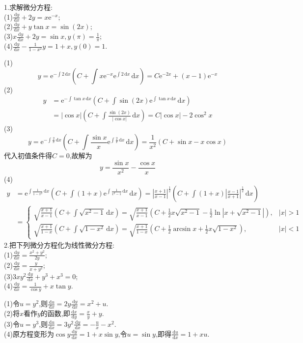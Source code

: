 \documentclass[titlepage,11pt,a4paper,twoside]{report}
\makeatletter
\newcommand\diff{\,\mathrm{d}}
\newcommand\e{\mathrm{e}}
\newenvironment{solve}{\par
	\pushQED{\qed}%
	\normalfont \topsep1\p@\@plus6\p@\relax
	\trivlist
	\item\relax
	{\hspace*{\parindent}{\heiti 解}\@addpunct{:}}\hspace\labelsep\ignorespaces
}{%
	\popQED\endtrivlist\@endpefalse
}
\makeatother
\begin{document}
1.求解微分方程:\\
(1)$\displaystyle\frac{\diff y}{\diff x}+2y=x\e^{-x}$;\\
(2)$\displaystyle\frac{\diff y}{\diff x}+y\tan x=\sin(2x)$;\\
(3)$\displaystyle x\frac{\diff y}{\diff x}+2y=\sin x,y(\pi)=\frac{1}{\pi}$;\\
(4)$\displaystyle\frac{\diff y}{\diff x}-\frac{1}{1-x^2}y=1+x,y(0)=1$.
\begin{solve}(1)\[y=\e^{-\int2\diff x}\left(C+\int x\e^{-x}\e^{\int2\diff x}\diff x\right)=C\e^{-2x}+(x-1)\e^{-x}\]
(2)\[\begin{split}
y&=\e^{-\int\tan x\diff x}\left(C+\int\sin(2x)\e^{\int\tan x\diff x}\diff x\right)\\
&=|\cos x|\left(C+\int\frac{\sin(2x)}{|\cos x|}\diff x\right)=C|\cos x|-2\cos^2x
\end{split}\]
(3)\[y=\e^{-\int\frac{2}{x}\diff x}\left(C+\int\frac{\sin x}{x}\e^{\int\frac{2}{x}\diff x}\diff x\right)=\frac{1}{x^2}(C+\sin x-x\cos x)\]
代入初值条件得$C=0$,故解为
\[y=\frac{\sin x}{x^2}-\frac{\cos x}{x}\]
(4)\[
\begin{split}
y&=\e^{\int\frac{1}{1-x^2}\diff x}\left(C+\int(1+x)\e^{\int\frac{1}{x^2-1}\diff x}\diff x\right)=\left|\frac{x+1}{x-1}\right|^{\frac{1}{2}}\left(C+\int(1+x)\left|\frac{x-1}{x+1}\right|^{\frac{1}{2}}\diff x\right)\\
&=\begin{cases}
\sqrt{\frac{x+1}{x-1}}\left(C+\int\sqrt{x^2-1}\diff x\right)=\sqrt{\frac{x+1}{x-1}}\left(C+\frac{1}{2}x\sqrt{x^2-1}-\frac{1}{2}\ln|x+\sqrt{x^2-1}|\right),&|x|>1\\
\sqrt{\frac{x+1}{1-x}}\left(C+\int\sqrt{1-x^2}\diff x\right)=\sqrt{\frac{x+1}{1-x}}\left(C+\frac{1}{2}\arcsin x+\frac{1}{2}x\sqrt{1-x^2}\right),&|x|<1
\end{cases}
\end{split}\]
\end{solve}
2.把下列微分方程化为线性微分方程:\\
(1)$\displaystyle\frac{\diff y}{\diff x}=\frac{x^2+y^2}{2y}$;\\
(2)$\displaystyle\frac{\diff y}{\diff x}=\frac{y}{x+y^2}$;\\
(3)$\displaystyle 3xy^2\frac{\diff y}{\diff x}+y^3+x^3=0$;\\
(4)$\displaystyle\frac{\diff y}{\diff x}=\frac{1}{\cos y}+x\tan y$.
\begin{solve}(1)令$u=y^2$,则$\frac{\diff u}{\diff x}=2y\frac{\diff y}{\diff x}=x^2+u$.\\
(2)将$x$看作$y$的函数,即$\frac{\diff x}{\diff y}=\frac{x}{y}+y$.\\
(3)令$u=y^3$,则$\frac{\diff u}{\diff x}=3y^2\frac{\diff y}{\diff x}=-\frac{u}{x}-x^2$.\\
(4)原方程变形为$\cos y\frac{\diff y}{\diff x}=1+x\sin y$,令$u=\sin y$,即得$\frac{\diff u}{\diff x}=1+xu$.
\end{solve}
\end{document}
